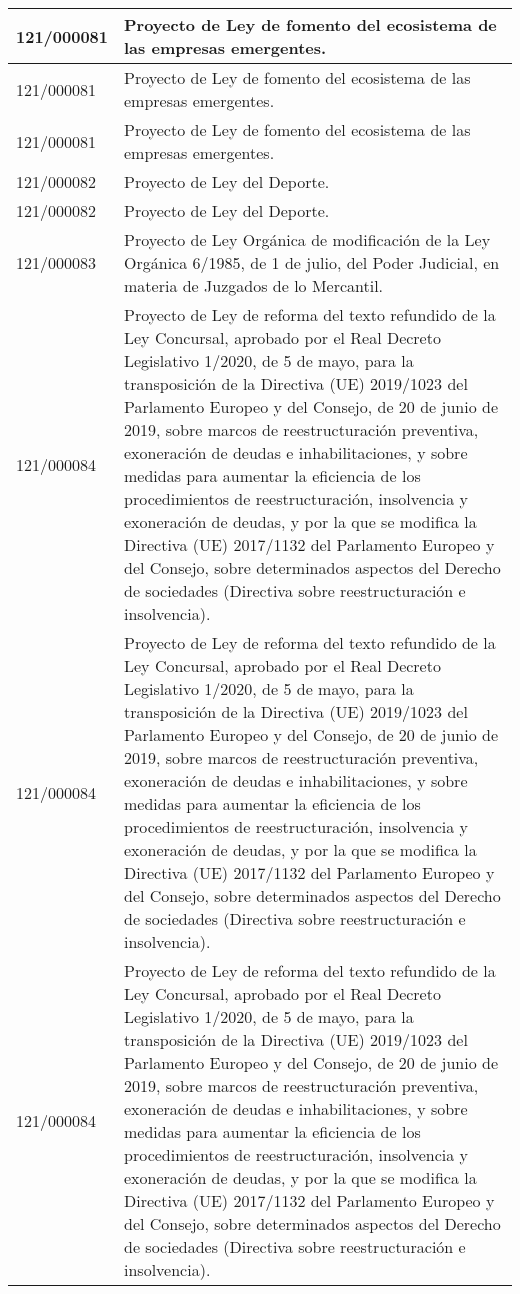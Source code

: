 {\begin{table}[H]
\begin{center}
\begin{tabularx}{\linewidth}{| l | X |}
\hline
121/000081 & Proyecto de Ley de fomento del ecosistema de las empresas emergentes. \\
\hline
121/000081 & Proyecto de Ley de fomento del ecosistema de las empresas emergentes. \\
\hline
121/000081 & Proyecto de Ley de fomento del ecosistema de las empresas emergentes. \\
\hline
121/000082 & Proyecto de Ley del Deporte. \\
\hline
121/000082 & Proyecto de Ley del Deporte. \\
\hline
121/000083 & Proyecto de Ley Orgánica de modificación de la Ley Orgánica 6/1985, de 1 de julio, del Poder Judicial, en materia de Juzgados de lo Mercantil. \\
\hline
121/000084 & Proyecto de Ley de reforma del texto refundido de la Ley Concursal, aprobado por el Real Decreto Legislativo 1/2020, de 5 de mayo, para la transposición de la Directiva (UE) 2019/1023 del Parlamento Europeo y del Consejo, de 20 de junio de 2019, sobre marcos de reestructuración preventiva, exoneración de deudas e inhabilitaciones, y sobre medidas para aumentar la eficiencia de los procedimientos de reestructuración, insolvencia y exoneración de deudas, y por la que se modifica la Directiva (UE) 2017/1132 del Parlamento Europeo y del Consejo, sobre determinados aspectos del Derecho de sociedades (Directiva sobre reestructuración e insolvencia). \\
\hline
121/000084 & Proyecto de Ley de reforma del texto refundido de la Ley Concursal, aprobado por el Real Decreto Legislativo 1/2020, de 5 de mayo, para la transposición de la Directiva (UE) 2019/1023 del Parlamento Europeo y del Consejo, de 20 de junio de 2019, sobre marcos de reestructuración preventiva, exoneración de deudas e inhabilitaciones, y sobre medidas para aumentar la eficiencia de los procedimientos de reestructuración, insolvencia y exoneración de deudas, y por la que se modifica la Directiva (UE) 2017/1132 del Parlamento Europeo y del Consejo, sobre determinados aspectos del Derecho de sociedades (Directiva sobre reestructuración e insolvencia). \\
\hline
121/000084 & Proyecto de Ley de reforma del texto refundido de la Ley Concursal, aprobado por el Real Decreto Legislativo 1/2020, de 5 de mayo, para la transposición de la Directiva (UE) 2019/1023 del Parlamento Europeo y del Consejo, de 20 de junio de 2019, sobre marcos de reestructuración preventiva, exoneración de deudas e inhabilitaciones, y sobre medidas para aumentar la eficiencia de los procedimientos de reestructuración, insolvencia y exoneración de deudas, y por la que se modifica la Directiva (UE) 2017/1132 del Parlamento Europeo y del Consejo, sobre determinados aspectos del Derecho de sociedades (Directiva sobre reestructuración e insolvencia). \\

\end{tabularx}
\end{center}
\end{table}}
